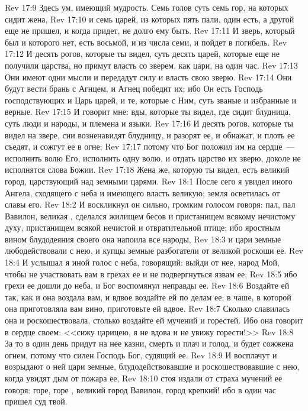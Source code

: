 \vs Rev 17:9 Здесь ум, имеющий мудрость. Семь голов суть семь гор, на которых сидит жена,
\vs Rev 17:10 и семь царей, из которых пять пали, один есть, а другой еще не пришел, и когда придет, не долго ему быть.
\vs Rev 17:11 И зверь, который был и которого нет, есть восьмой, и из числа семи, и пойдет в погибель.
\vs Rev 17:12 И десять рогов, которые ты видел, суть десять царей, которые еще не получили царства, но примут власть со зверем, как цари, на один час.
\vs Rev 17:13 Они имеют одни мысли и передадут силу и власть свою зверю.
\vs Rev 17:14 Они будут вести брань с Агнцем, и Агнец победит их; ибо Он есть Господь господствующих и Царь царей, и те, которые с Ним, суть званые и избранные и верные.
\vs Rev 17:15 И говорит мне: вды, которые ты видел, где сидит блудница, суть люди и народы, и племена и языки.
\vs Rev 17:16 И десять рогов, которые ты видел на звере, сии возненавидят блудницу, и разорят ее, и обнажат, и плоть ее съедят, и сожгут ее в огне;
\vs Rev 17:17 потому что Бог положил им на сердце~--- исполнить волю Его, исполнить одну волю, и отдать царство их зверю, доколе не исполнятся слова Божии.
\vs Rev 17:18 Жена же, которую ты видел, есть великий город, царствующий над земными царями.
\vs Rev 18:1 После сего я увидел иного Ангела, сходящего с неба и имеющего власть великую; земля осветилась от славы его.
\vs Rev 18:2 И воскликнул он сильно, громким голосом говоря: пал, пал Вавилон, великая , сделался жилищем бесов и пристанищем всякому нечистому духу, пристанищем всякой нечистой и отвратительной птице; ибо яростным вином блудодеяния своего она напоила все народы,
\vs Rev 18:3 и цари земные любодействовали с нею, и купцы земные разбогатели от великой роскоши ее.
\rsbpar\vs Rev 18:4 И услышал я иной голос с неба, говорящий: выйди от нее, народ Мой, чтобы не участвовать вам в грехах ее и не подвергнуться язвам ее;
\vs Rev 18:5 ибо грехи ее дошли до неба, и Бог воспомянул неправды ее.
\vs Rev 18:6 Воздайте ей так, как и она воздала вам, и вдвое воздайте ей по делам ее; в чаше, в которой она приготовляла вам вино, приготовьте ей вдвое.
\vs Rev 18:7 Сколько славилась она и роскошествовала, столько воздайте ей мучений и горестей. Ибо она говорит в сердце своем: <<сижу царицею, я не вдова и не увижу горести!>>
\vs Rev 18:8 За то в один день придут на нее казни, смерть и плач и голод, и будет сожжена огнем, потому что силен Господь Бог, судящий ее.
\vs Rev 18:9 И восплачут и возрыдают о ней цари земные, блудодействовавшие и роскошествовавшие с нею, когда увидят дым от пожара ее,
\vs Rev 18:10 стоя издали от страха мучений ее  говоря: горе, горе , великий город Вавилон, город крепкий! ибо в один час пришел суд твой.
